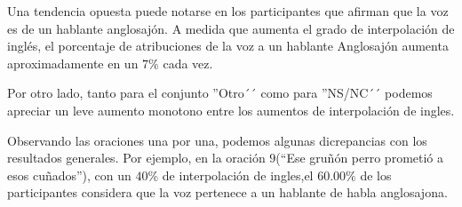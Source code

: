 Una tendencia opuesta puede notarse en los participantes que afirman que la voz es de un hablante anglosajón. A medida que aumenta el grado de interpolación de inglés, el porcentaje de atribuciones de la voz a un hablante Anglosajón aumenta aproximadamente en un $7
\%$ cada vez.

Por otro lado, tanto para el conjunto ''Otro´´ como para ''NS/NC´´ podemos apreciar un leve aumento monotono entre los aumentos de interpolación de ingles.





Observando las oraciones una por una, podemos algunas dicrepancias con los resultados generales. Por ejemplo, en la oración $9$(``Ese gruñón perro prometió a esos cuñados''), con un $40\%$ de interpolación de ingles,\cuantoEsParaGeneral el $60.00\%$ de los participantes considera que la voz pertenece a un hablante de habla anglosajona.

